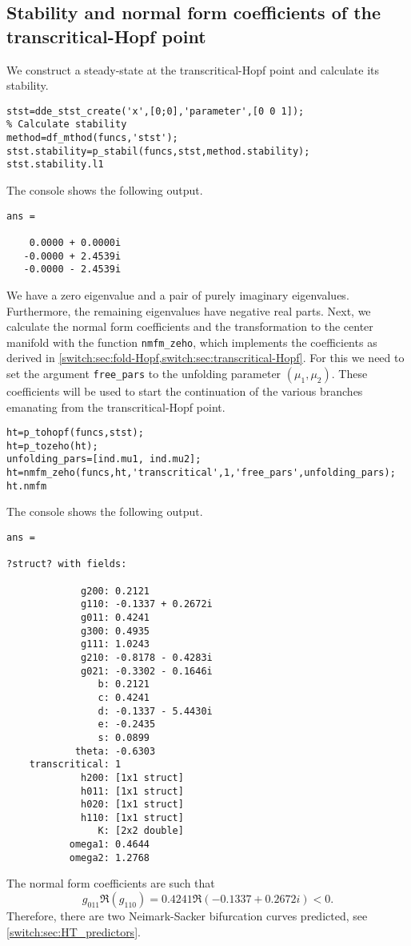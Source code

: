 \subsection{Stability and normal form coefficients of the transcritical-Hopf point} We construct a steady-state at the transcritical-Hopf point and calculate its stability.
\begin{lstlisting}[style=customMatlab]
%% Construct transcritical-Hopf bifucation point
stst=dde_stst_create('x',[0;0],'parameter',[0 0 1]);
% Calculate stability
method=df_mthod(funcs,'stst');
stst.stability=p_stabil(funcs,stst,method.stability);
stst.stability.l1
\end{lstlisting}
The \MATLAB console shows the following output.
\begin{lstlisting}[style=matlabConsole]
ans =

    0.0000 + 0.0000i
   -0.0000 + 2.4539i
   -0.0000 - 2.4539i
\end{lstlisting}
We have a zero eigenvalue and a pair of purely imaginary eigenvalues. Furthermore, the remaining eigenvalues have negative real parts. Next, we calculate the normal form coefficients and the transformation to the center manifold with the function \lstinline|nmfm_zeho|, which implements the coefficients as derived in \cref{switch:sec:fold-Hopf,switch:sec:transcritical-Hopf}. For this we need to set the argument \lstinline|free_pars| to the unfolding parameter $(\mu_1,\mu_2)$. These coefficients will be used to start the continuation of the various branches emanating from the transcritical-Hopf point.
\begin{lstlisting}[style=customMatlab]
%% Coefficients of the parameter dependent normal form
ht=p_tohopf(funcs,stst);
ht=p_tozeho(ht);
unfolding_pars=[ind.mu1, ind.mu2];
ht=nmfm_zeho(funcs,ht,'transcritical',1,'free_pars',unfolding_pars);
ht.nmfm
\end{lstlisting}
The \MATLAB console shows the following output.
\begin{lstlisting}[style=matlabConsole,keepspaces=true]
ans = 

?struct? with fields:

             g200: 0.2121
             g110: -0.1337 + 0.2672i
             g011: 0.4241
             g300: 0.4935
             g111: 1.0243
             g210: -0.8178 - 0.4283i
             g021: -0.3302 - 0.1646i
                b: 0.2121
                c: 0.4241
                d: -0.1337 - 5.4430i
                e: -0.2435
                s: 0.0899
            theta: -0.6303
    transcritical: 1
             h200: [1x1 struct]
             h011: [1x1 struct]
             h020: [1x1 struct]
             h110: [1x1 struct]
                K: [2x2 double]
           omega1: 0.4644
           omega2: 1.2768
\end{lstlisting}
The normal form coefficients are such that
\[
g_{011} \Re ( g_{110}) = 0.4241 \Re (- 0.1337 + 0.2672i ) < 0.
\]
Therefore, there are two Neimark-Sacker bifurcation curves predicted, see \cref{switch:sec:HT_predictors}.

